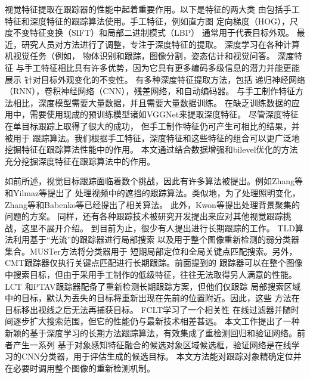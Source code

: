 \documentclass[promaster]{thesis-uestc}
\begin{document}
视觉特征提取在跟踪器的性能中起着重要作用。以下是特征的两大类
由包括手工特征和深度特征的跟踪算法使用。手工特征，例如直方图
定向梯度（HOG），尺度不变特征变换（SIFT）和局部二进制模式（LBP）
通常用于代表目标外观。 最近，研究人员对方法进行了调整，专注于深度特征的提取。 深度学习在各种计算机视觉任务（例如，
物体识别和跟踪，图像分割，姿态估计和视觉问答。 深度特征
与手工特征相比具有许多优势，因为它具有更多编码多级信息的潜力并能更能展示
针对目标外观变化的不变性。 有多种深度特征提取方法，包括
递归神经网络（RNN）\cite{graves2013speech}，卷积神经网络（CNN）\cite{vgg}，残差网络\cite{resnet}，和自动编码器\cite{hua2018visual}。
与手工制作特征方法相比，深度模型需要大量数据，并且需要大量数据训练。
在缺乏训练数据的应用中，需要使用现成的预训练模型诸如VGGNet\cite{vgg}来提取深度特征。 
尽管深度特征在单目标跟踪上取得了很大的成功\cite{siamfc}\cite{eco}\cite{danelljan2015convolutional}，
但手工制作特征\cite{danelljan2015learning}\cite{lukezic2017discriminative}仍可产生可相比的结果，并被用于
跟踪算法。我们根据手工特征，深度特征和这些特征的组合可以更广泛地挖掘特征在跟踪算法性能中的作用。
本文通过结合数据增强和bilevel优化的方法充分挖掘深度特征在跟踪算法中的作用。


如前所述，视觉目标跟踪面临着数个挑战，因此有许多算法被提出。例如Zhang等\cite{zhang2014partial}和Yilmaz等\cite{yilmaz2004contour}提出了
处理视频中的遮挡的跟踪算法。类似地，为了处理照明变化，Zhang等\cite{zhong2012robust}和Babenko\cite{babenko2009visual}等已经提出了相关算法。
此外，Kwon等\cite{kwon2010visual}提出处理背景聚集的问题的方案。
同样，还有各种跟踪技术被研究开发提出来应对其他视觉跟踪挑战，这里不展开介绍。
到目前为止，很少有人提出进行长期跟踪的工作。 TLD\cite{kalal2011tracking}算法利用基于“光流”的跟踪器进行局部搜索
以及用于整个图像重新检测的弱分类器集合。MUSTer\cite{hong2015multi}方法将分类器用于
短期局部定位和全局关键点匹配搜索。另外，CMT\cite{nebehay2015clustering}跟踪器仅执行关键点匹配进行长期跟踪。前面提到的
跟踪器可以在整个图像中搜索目标，但由于采用手工制作的低级特征，往往无法取得另人满意的性能。 LCT\cite{ma2015long}
和PTAV\cite{fan2017parallel}跟踪器配备了重新检测长期跟踪方案，但他们仅跟踪
局部搜索区域中的目标，默认为丢失的目标将重新出现在先前的位置附近。因此，这些
方法在目标移出视线之后无法再捕获目标。 FCLT\cite{lukevzivc2018fucolot}学习了一个相关性
在线过滤器并随时间逐步扩大搜索范围，但它的性能仍与最新技术相差甚远。
本文工作提出了一种新颖的基于深度学习的长期方法跟踪算法，有效集成了重检测回归和验证网络。前者产生一系列
基于对象感知特征融合的候选对象区域候选框，验证网络是在线学习的CNN分类器，用于评估生成的候选目标。
本文方法能对跟踪对象精确定位并在必要时调用整个图像的重新检测机制。
\end{document}
